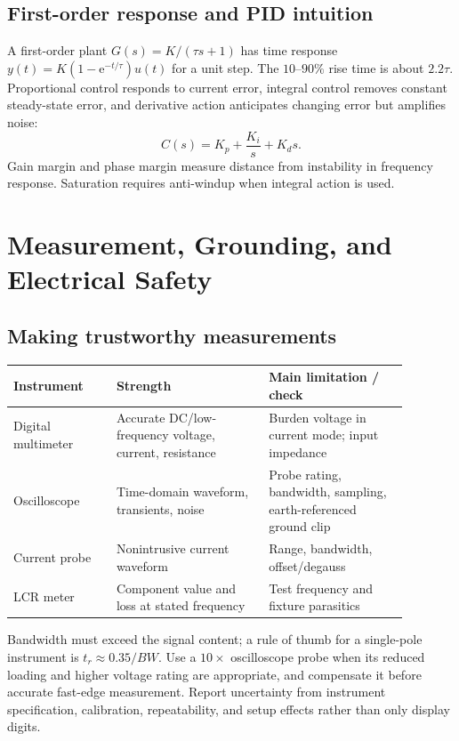 \documentclass[10pt]{article}
\newcommand{\e}{\mathrm{e}}
\begin{document}
\subsection{First-order response and PID intuition}
A first-order plant $G(s)=K/(\tau s+1)$ has time response
$y(t)=K(1-\e^{-t/\tau})u(t)$ for a unit step. The $10$--$90\%$ rise time is
about $2.2\tau$. Proportional control responds to current error, integral control
removes constant steady-state error, and derivative action anticipates changing
error but amplifies noise:
\begin{equation} C(s)=K_p+\frac{K_i}{s}+K_ds. \end{equation}
Gain margin and phase margin measure distance from instability in frequency
response. Saturation requires anti-windup when integral action is used.

\section{Measurement, Grounding, and Electrical Safety}

\subsection{Making trustworthy measurements}
\begin{center}
\small
\begin{tabular}{p{0.23\linewidth}p{0.34\linewidth}p{0.31\linewidth}}
\toprule
Instrument & Strength & Main limitation / check \\
\midrule
Digital multimeter & Accurate DC/low-frequency voltage, current, resistance & Burden voltage in current mode; input impedance \\
Oscilloscope & Time-domain waveform, transients, noise & Probe rating, bandwidth, sampling, earth-referenced ground clip \\
Current probe & Nonintrusive current waveform & Range, bandwidth, offset/degauss \\
LCR meter & Component value and loss at stated frequency & Test frequency and fixture parasitics \\
\bottomrule
\end{tabular}
\end{center}
Bandwidth must exceed the signal content; a rule of thumb for a single-pole
instrument is $t_r\approx0.35/BW$. Use a $10\times$ oscilloscope probe when
its reduced loading and higher voltage rating are appropriate, and compensate it
before accurate fast-edge measurement. Report uncertainty from instrument
specification, calibration, repeatability, and setup effects rather than only
display digits.
\end{document}
